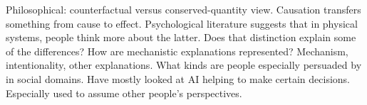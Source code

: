 Philosophical: counterfactual versus conserved-quantity view.
Causation transfers something from cause to effect.
Psychological literature suggests that in physical systems, people think more about the
latter.
Does that distinction explain some of the differences?
How are mechanistic explanations represented?
Mechanism, intentionality, other explanations.
What kinds are people especially persuaded by in social domains.
Have mostly looked at AI helping to make certain decisions.
Especially used to assume other people's perspectives.
